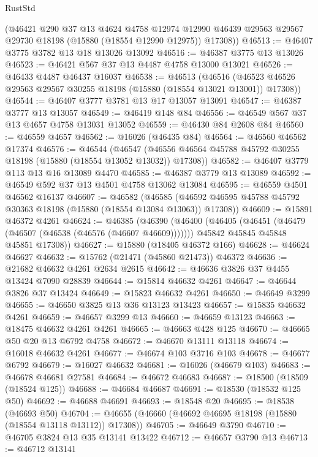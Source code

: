 \begin{lexlean}{RustStd}
\begin{coremodule}
      (@46421
        @290
        @37
        @13
        @4624
        @4758
        @12974
        @12990
        @46439
        @29563
        @29567
        @29730
        @18198
        (@15880 (@18554 @12990 @12975))
        @17308))
@46513 := @46407 @3775 @3782 @13 @18 @13026 @13092
@46516 := @46387 @3775 @13 @13026
@46523 := @46421 @567 @37 @13 @4487 @4758 @13000 @13021
@46526 := @46433 @4487 @46437 @16037
@46538 := @46513
    (@46516 (@46523 @46526 @29563 @29567 @30255 @18198 (@15880 (@18554 @13021 @13001)) @17308))
@46544 := @46407 @3777 @3781 @13 @17 @13057 @13091
@46547 := @46387 @3777 @13 @13057
@46549 := @46419 @148 @84
@46556 := @46549 @567 @37 @13 @4657 @4758 @13031 @13052
@46559 := @46430 @84 @2608 @84
@46560 := @46559 @4657
@46562 := @16026 (@46435 @84)
@46564 := @46560 @46562 @17374
@46576 := @46544
    (@46547 (@46556 @46564 @45788 @45792 @30255 @18198 (@15880 (@18554 @13052 @13032)) @17308))
@46582 := @46407 @3779 @113 @13 @16 @13089 @4470
@46585 := @46387 @3779 @13 @13089
@46592 := @46549 @592 @37 @13 @4501 @4758 @13062 @13084
@46595 := @46559 @4501 @46562 @16137
@46607 := @46582
    (@46585 (@46592 @46595 @45788 @45792 @30363 @18198 (@15880 (@18554 @13084 @13063)) @17308))
@46609 := @15891 @46372 @4261
@46624 := @46385
    (@46390
      (@46400
        (@46405 (@46451 (@46479 (@46507 (@46538 (@46576 (@46607 @46609)))))))
        @45842
        @45845
        @45848
        @45851
        @17308))
@46627 := @15880 (@18405 @46372 @166)
@46628 := @46624 @46627
@46632 := @15762 (@21471 (@45860 @21473)) @46372
@46636 := @21682 @46632 @4261 @2634 @2615
@46642 := @46636 @3826 @37 @4455 @13424 @7090 @28839
@46644 := @15814 @46632 @4261
@46647 := @46644 @3826 @37 @13424
@46649 := @15823 @46632 @4261
@46650 := @46649 @3299
@46655 := @46650 @3825 @13 @36 @13123 @13423
@46657 := @15835 @46632 @4261
@46659 := @46657 @3299 @13
@46660 := @46659 @13123
@46663 := @18475 @46632 @4261 @4261
@46665 := @46663 @428 @125
@46670 := @46665 @50 @20 @13 @6792 @4758
@46672 := @46670 @13111 @13118
@46674 := @16018 @46632 @4261
@46677 := @46674 @103 @3716 @103
@46678 := @46677 @6792
@46679 := @16027 @46632
@46681 := @16026 (@46679 @103)
@46683 := @46678 @46681 @27581
@46684 := @46672 @46683
@46687 := @18500 (@18509 (@18524 @125))
@46688 := @46684 @46687
@46691 := @18530 (@18532 @125 @50)
@46692 := @46688 @46691
@46693 := @18548 @20
@46695 := @18538 (@46693 @50)
@46704 := @46655 (@46660 (@46692 @46695 @18198 (@15880 (@18554 @13118 @13112)) @17308))
@46705 := @46649 @3790
@46710 := @46705 @3824 @13 @35 @13141 @13422
@46712 := @46657 @3790 @13
@46713 := @46712 @13141

\end{coremodule}
\end{lexlean}
